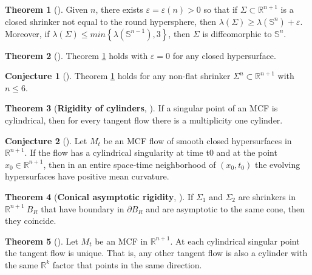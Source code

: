 \documentclass{amsart}
\theoremstyle{definition}
\newtheorem{Thm}{Theorem}[section]
\newtheorem{Con}{Conjecture}[section]
\begin{document}
\begin{refsection}
\begin{Thm}[\cite{ColdingIlmanenMinicozziWhite2013}] \label{Colding Ilmanen Minicozzi White 2013}
Given $n$, there exists  $\varepsilon = \varepsilon(n) > 0$ so that if $\Sigma \subset {\mathbb{R}}^{n+1}$
is a closed shrinker not equal to the round hypersphere, then $\lambda\left(\Sigma\right) \geq \lambda\left({\mathbb{S}}^{n}\right) + \varepsilon$. Moreover,
if $\lambda\left(\Sigma\right) \leq min \left\{  \lambda \left({\mathbb{S}}^{n-1}\right) , 3 \right\}$, then $\Sigma$ is diffeomorphic to ${\mathbb{S}}^{n}$.
\end{Thm}
 
 \begin{Thm}[\cite{BernsteinWang2016}]
Theorem \ref{Colding Ilmanen Minicozzi White 2013} holds  with $\varepsilon = 0$ for any closed hypersurface.
\end{Thm}

\begin{Con}[\cite{ColdingMinicozziPedersen2015}] Theorem \ref{Colding Ilmanen Minicozzi White 2013} holds for any
non-flat shrinker ${\Sigma}^{n}  \subset {\mathbb{R}}^{n+1}$ with $n \leq 6$.
\end{Con}

\begin{Thm}[\textbf{Rigidity of cylinders}, \cite{ColdingIlmanenMinicozzi2015}]
If a singular point of an MCF is cylindrical, then for every tangent flow there is a multiplicity one cylinder. 
\end{Thm}

\begin{Con}[\cite{ColdingMinicozziPedersen2015}] Let ${M}_{t}$  be an MCF flow of smooth closed hypersurfaces in
${\mathbb{R}}^{n+1}$. If the flow has a cylindrical singularity at time t0 and at the point $x_0 \in {\mathbb{R}}^{n+1}$, then in an 
entire space-time neighborhood of $\left(x_0,t_0\right)$ the evolving hypersurfaces have positive mean curvature.
\end{Con}

\begin{Thm}[\textbf{Conical asymptotic rigidity}, \cite{Wang2014}]
If ${\Sigma}_{1}$ and ${\Sigma}_{2}$ are shrinkers in ${\mathbb{R}}^{n+1} \ B_{R}$ that have boundary in $\partial B_{R}$ 
and are asymptotic to the same cone, then they coincide.
\end{Thm}

 \begin{Thm}[\cite{ColdingMinicozzi2015a}] Let ${M}_{t}$ be an MCF in ${\mathbb{R}}^{n+1}$. At each cylindrical singular
 point the tangent flow is unique. That is, any other tangent flow is also a cylinder with the same ${\mathbb{R}}^{k}$ factor 
 that points in the same direction.
\end{Thm}
   

\end{refsection}
\end{document}
